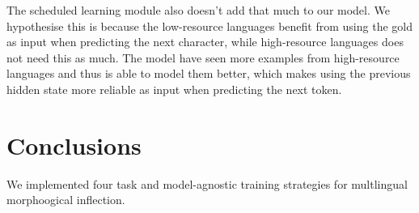 \documentclass[11pt,a4paper]{article}
\begin{document}
The scheduled learning module also doesn't add that much to our
model. We hypothesise this is because the low-resource languages
benefit from using the gold as input when predicting the next
character, while high-resource languages does not need this as
much. The model have seen more examples from high-resource languages
and thus is able to model them better, which makes using the previous
hidden state more reliable as input when predicting the next token.











\section{Conclusions}

We implemented four task and model-agnostic training strategies for
multlingual morphoogical inflection. 



 



\end{document}
